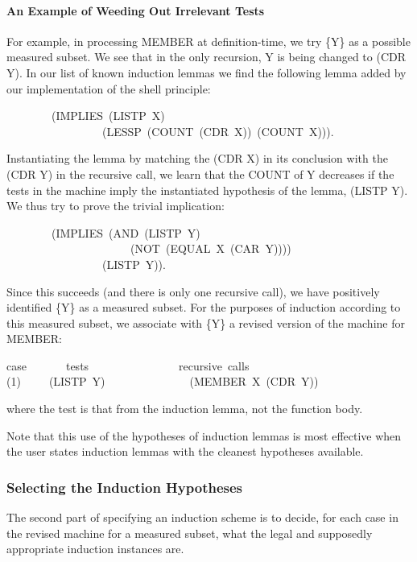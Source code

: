 \documentclass[11pt]{book}
\newenvironment{pubasis}{\begin{flushleft}\ttfamily\small}{\normalsize\rmfamily\end{flushleft}}
\newcommand{\pubdefaulttextsize}{\large}
\begin{document}
\paragraph{An Example of Weeding Out Irrelevant Tests}
\pubdefaulttextsize
For example, in processing MEMBER at definition-time, we try \{Y\} as a
possible measured subset.  We see that in the only recursion, Y is
being changed to (CDR Y).  In our list of
known induction lemmas we find the following lemma added by our
implementation of the shell principle:
\begin{pubasis}
~~~~~~~~(IMPLIES~(LISTP~X)\\
~~~~~~~~~~~~~~~~~(LESSP~(COUNT~(CDR~X))~(COUNT~X))).\\
\end{pubasis}
Instantiating the lemma by matching the (CDR X) in its conclusion
with the (CDR Y) in the recursive call, we  learn that the
COUNT of Y decreases if the tests in the machine imply
the instantiated hypothesis of the lemma,  (LISTP Y).
We thus try to prove the trivial implication:
\begin{pubasis}
~~~~~~~~(IMPLIES~(AND~(LISTP~Y)\\
~~~~~~~~~~~~~~~~~~~~~~(NOT~(EQUAL~X~(CAR~Y))))\\
~~~~~~~~~~~~~~~~~(LISTP~Y)).\\
\end{pubasis}
Since this succeeds (and there is only one recursive call), we 
have positively identified \{Y\} as a measured subset.
For the purposes of induction according to this measured subset,
we associate with \{Y\} a revised version of the machine for MEMBER:
\begin{pubasis}
case~~~~~~~tests~~~~~~~~~~~~~~~~recursive~calls\\

(1)~~~~~(LISTP~Y)~~~~~~~~~~~~~~~(MEMBER~X~(CDR~Y))\\
\end{pubasis}
where the test is that from the induction lemma, not the function body.

Note that this use of the hypotheses of induction lemmas is most effective
when the user states induction lemmas with the
cleanest hypotheses available.
\subsubsection{Selecting the Induction Hypotheses}
\pubdefaulttextsize
The second part of specifying an induction scheme is to decide, for
each case in the revised machine for a measured subset, what the
legal and supposedly appropriate induction instances are.
\end{document}
